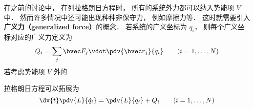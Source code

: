 

在之前的讨论中， 在列拉格朗日方程时， 所有的系统外力都可以纳入势能项 $V$ 中． 然而许多情况中还可能出现种种非保守力， 例如摩擦力等． 这时就需要引入\textbf{广义力（generalized force）}的概念． 若系统的广义坐标为 $q_i$， 则每个广义坐标对应的广义力定义为
\begin{equation}
Q_i = \sum_j \bvec F_j \vdot \pdv{\bvec r_j}{q_i} \qquad (i=1,\dots,N)
\end{equation}
若考虑势能项 $V$ 外的

 拉格朗日方程可以拓展为
\begin{equation}
\dv{t} \pdv{L}{\dot q_i} = \pdv{L}{q_i} + Q_i
\qquad (i=1,\dots,N)
\end{equation}

